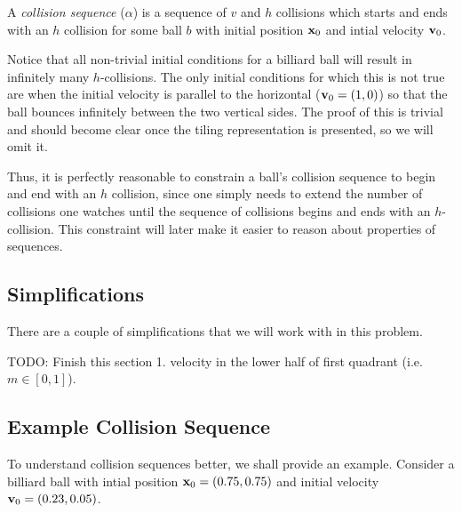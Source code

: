 \begin{definition}
  A \emph{collision sequence} ($\alpha$) is a sequence of $v$ and $h$ collisions which starts and ends with an $h$ collision for some ball $b$ with initial position $\mathbf{x}_0$ and intial velocity $\mathbf{v}_0$.
\end{definition}

Notice that all non-trivial initial conditions for a billiard ball will result in infinitely many $h$-collisions. The only initial conditions for which this is not true are when the initial velocity is parallel to the horizontal ($\mathbf{v}_0 = (1, 0)$) so that the ball bounces infinitely between the two vertical sides. The proof of this is trivial and should become clear once the tiling representation is presented, so we will omit it.

Thus, it is perfectly reasonable to constrain a ball's collision sequence to begin and end with an $h$ collision, since one simply needs to extend the number of collisions one watches until the sequence of collisions begins and ends with an $h$-collision. This constraint will later make it easier to reason about properties of sequences.

\subsection{Simplifications}

There are a couple of simplifications that we will work with in this problem.

TODO: Finish this section
1. velocity in the lower half of first quadrant (i.e. $m \in [0,1]$).

\subsection{Example Collision Sequence}

To understand collision sequences better, we shall provide an example. Consider a billiard ball with intial position $\mathbf{x}_0 = (0.75, 0.75)$ and initial velocity $\mathbf{v}_0 = (0.23, 0.05)$.

